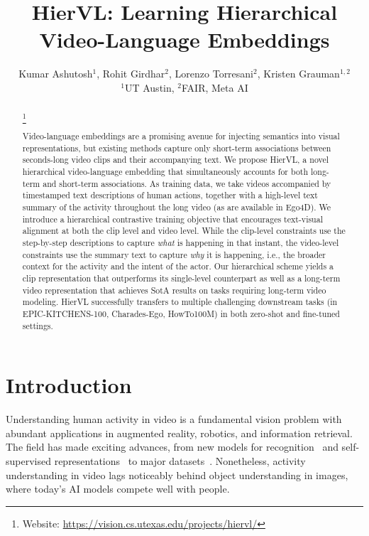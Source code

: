 \documentclass[10pt,twocolumn,letterpaper]{article}
\newcommand\blfootnote[1]{\begingroup
  \renewcommand\thefootnote{}\footnote{#1}\addtocounter{footnote}{-1}\endgroup
}
\newcommand{\modelname}[0]{{HierVL}}
\begin{document}
\title{\modelname: Learning Hierarchical Video-Language Embeddings}



\author{Kumar Ashutosh$^{1}$, Rohit Girdhar$^{2}$, Lorenzo Torresani$^{2}$, Kristen Grauman$^{1,2}$\\
$^{1}$UT Austin, $^{2}$FAIR, Meta AI\\
}
\maketitle





\begin{abstract}
\blfootnote{Website: \href{https://vision.cs.utexas.edu/projects/hiervl/}{https://vision.cs.utexas.edu/projects/hiervl/}}
Video-language embeddings are a promising avenue for injecting semantics into visual representations, but existing methods capture only short-term associations between seconds-long video clips and their accompanying text. 
We propose \modelname, a novel hierarchical video-language embedding 
that simultaneously accounts for both long-term and short-term associations. 
As training data, we take videos accompanied by timestamped text descriptions of human actions, together with a high-level text summary of the activity throughout the long video (as are available in Ego4D).
We introduce a hierarchical contrastive training objective that encourages text-visual alignment at both the clip level and video level.
While the clip-level constraints use the step-by-step descriptions to capture  \emph{what} is happening in that instant, the video-level constraints use the summary text to capture \emph{why} it is happening, i.e., the broader context for the activity and the intent of the actor.
Our hierarchical scheme
yields a clip representation that outperforms its single-level counterpart as well as a long-term video representation that achieves SotA results on tasks requiring long-term video modeling.  HierVL
successfully transfers to multiple challenging downstream tasks (in EPIC-KITCHENS-100, Charades-Ego, HowTo100M) in both zero-shot and fine-tuned settings.

\end{abstract} \section{Introduction}
\label{sec:intro}


Understanding human activity in video is a fundamental vision problem with abundant applications in augmented reality, robotics, and information retrieval.  The field has made exciting advances, from new models for recognition~\cite{mvitv2,memvit,slowfast} and self-supervised representations~\cite{mil-nce,univl,videoclip,egovlp}  to major datasets~\cite{ego4d,howto100m,epic-kitchens-100,crosstask,charades-ego}.  Nonetheless, activity understanding in video lags noticeably behind object understanding in images, where today's 
AI models compete well with people.
\end{document}
